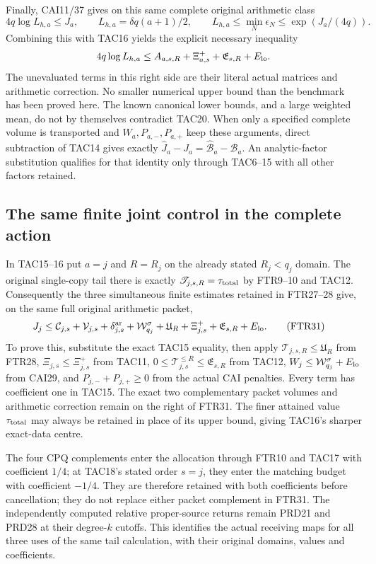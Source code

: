 Finally, CAI11/37 gives on this same complete original arithmetic class
\[
 4q\log L_{h,a}\le J_a,\qquad
 L_{h,a}=\delta q(a+1)/2,\qquad
 L_{h,a}\le\min_N\epsilon_N\le\exp(J_a/(4q)).
 \tag{TAC20}
\]
Combining this with TAC16 yields the explicit necessary inequality
\[
 4q\log L_{h,a}\le A_{a,s,R}+\Xi^+_{a,s}
                            +\mathfrak E_{s,R}+E_{\rm lo}.
\]
The unevaluated terms in this right side are their literal actual
matrices and arithmetic correction.  No smaller numerical upper bound
than the benchmark has been proved here.  The known canonical lower
bounds, and a large weighted mean, do not by themselves contradict
TAC20.  When only a specified complete volume is transported and
$W_a,P_{a,-},P_{a,+}$ keep these arguments, direct subtraction of
TAC14 gives exactly $\widehat J_a-J_a=\widehat{\mathcal B}_a-
\mathcal B_a$.  An analytic-factor substitution qualifies for that
identity only through TAC6--15 with all other factors retained.
\endgroup

\begingroup
\subsection{The same finite joint control in the complete action}
In TAC15--16 put $a=j$ and $R=R_j$ on the already stated
$R_j<q_j$ domain. The original single-copy tail there is exactly
$\mathscr T_{j,s,R}=\tau_{\rm total}$ by FTR9--10 and TAC12.
Consequently the three simultaneous finite estimates retained in
FTR27--28 give, on the same full original arithmetic packet,
\[
\begin{split}
 J_j\le{}&\mathcal C_{j,s}+\mathcal V_{j,s}
     +\delta_{j,s}^{\rm ar}+\mathcal W_{q_j}^{\sigma}
     +\mathfrak U_R+\Xi_{j,s}^{+}
     +\mathfrak E_{s,R}+E_{\rm lo}.                      \tag{FTR31}
\end{split}
\]
To prove this, substitute the exact TAC15 equality, then apply
$\mathscr T_{j,s,R}\le\mathfrak U_R$ from FTR28,
$\Xi_{j,s}\le\Xi_{j,s}^+$ from TAC11,
$0\le\mathcal T_{j,s}^{\le R}\le\mathfrak E_{s,R}$ from TAC12,
$W_j\le\mathcal W_{q_j}^{\sigma}+E_{\rm lo}$ from CAI29,
and $P_{j,-}+P_{j,+}\ge0$ from the actual CAI penalties.
Every term has coefficient one in TAC15. The exact two complementary
packet volumes and arithmetic correction remain on the right of FTR31.
The finer attained value $\tau_{\rm total}$ may always be retained
in place of its upper bound, giving TAC16's sharper exact-data centre.

The four CPQ complements enter the allocation through FTR10 and
TAC17 with coefficient $1/4$; at TAC18's stated order $s=j$,
they enter the matching budget with coefficient $-1/4$.
They are therefore retained with both
coefficients before cancellation; they do not replace either packet
complement in FTR31. The independently computed relative proper-source
returns remain PRD21 and PRD28 at their degree-$k$ cutoffs. This
identifies the actual receiving maps for all three uses of the same
tail calculation, with their original domains, values and coefficients.
\endgroup
